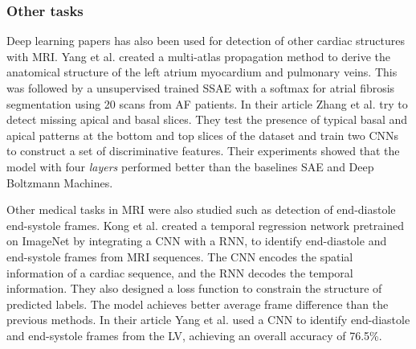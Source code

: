 \documentclass[journal]{IEEEtran}
\begin{document}
\subsubsection{Other tasks}
Deep learning papers has also been used for detection of other cardiac structures with MRI\@.
Yang et al.\cite{yang2017segmenting} created a multi-atlas propagation method to derive the anatomical structure of the left atrium myocardium and pulmonary veins.
This was followed by a unsupervised trained SSAE with a softmax for atrial fibrosis segmentation using 20 scans from AF patients.
In their article Zhang et al.\cite{zhang2016automated} try to detect missing apical and basal slices.
They test the presence of typical basal and apical patterns at the bottom and top slices of the dataset and train two CNNs to construct a set of discriminative features.
Their experiments showed that the model with four \textit{layers} performed better than the baselines SAE and Deep Boltzmann Machines.

Other medical tasks in MRI were also studied such as detection of end-diastole end-systole frames.
Kong et al.\cite{kong2016recognizing} created a temporal regression network pretrained on ImageNet by integrating a CNN with a RNN, to identify end-diastole and end-systole frames from MRI sequences.
The CNN encodes the spatial information of a cardiac sequence, and the RNN decodes the temporal information.
They also designed a loss function to constrain the structure of predicted labels.
The model achieves better average frame difference than the previous methods.
In their article Yang et al.\cite{yang2017convolutional} used a CNN to identify end-diastole and end-systole frames from the LV, achieving an overall accuracy of 76.5\%.
\end{document}
